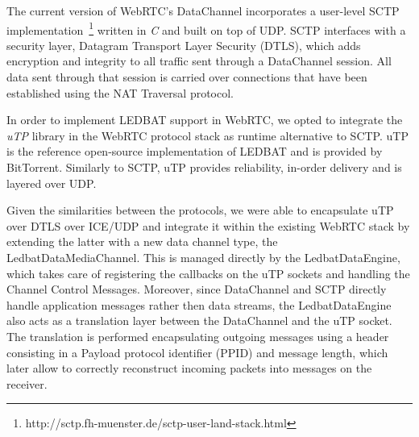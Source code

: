 \documentclass{sig-alternate}
\begin{document}
The current version of WebRTC's DataChannel incorporates a user-level SCTP
implementation~\footnote{http://sctp.fh-muenster.de/sctp-user-land-stack.html} written in
\textit{C} and built on top of UDP. SCTP interfaces with a security layer, Datagram
Transport Layer Security (DTLS), which adds encryption and integrity to all traffic sent
through a DataChannel session. All data sent through that session is carried over
connections that have been established using the NAT Traversal protocol.



In order to implement LEDBAT support in WebRTC, we opted to integrate the \textit{uTP} library 
\cite{utp-repo} in the WebRTC protocol stack as runtime alternative to SCTP. uTP is the reference
open-source implementation of LEDBAT and is provided by BitTorrent. Similarly to SCTP, uTP 
provides reliability, in-order delivery and is layered over UDP.

Given the similarities between the protocols, we were able to encapsulate uTP over DTLS over ICE/UDP and integrate it within the existing WebRTC stack by extending the latter with a new data channel type, the LedbatDataMediaChannel. This is managed directly by the LedbatDataEngine, which takes care of registering the callbacks on the uTP sockets and handling the Channel Control Messages. Moreover, since DataChannel and SCTP directly handle application messages rather then data streams, the LedbatDataEngine also acts as a translation layer between the DataChannel and the uTP socket. The translation is performed encapsulating outgoing messages using a header consisting in a Payload protocol identifier (PPID) and message length, which later allow to correctly reconstruct incoming packets into messages on the receiver.
\end{document}
